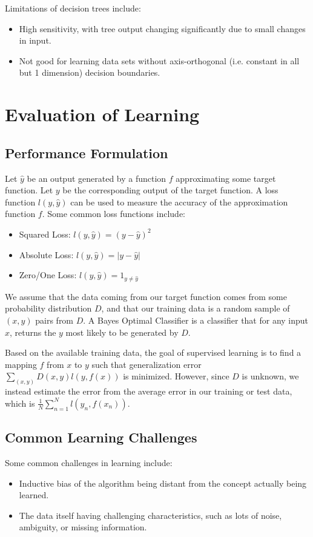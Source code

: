 \documentclass[12pt,titlepage]{article}
\let\stdsection\section
\renewcommand\section{\clearpage\stdsection}
\begin{document}
      Limitations of decision trees include:
      \begin{itemize}
        \item High sensitivity, with tree output changing significantly due to small changes in input.
        \item Not good for learning data sets without axis-orthogonal (i.e. constant in all but 1 dimension) decision boundaries.
      \end{itemize}

  \section{Evaluation of Learning}

    \subsection{Performance Formulation}
      Let $\hat{y}$ be an output generated by a function $f$ approximating some target function. Let $y$ be the corresponding
      output of the target function. A loss function $l(y, \hat{y})$ can be used to measure the accuracy of the approximation
      function $f$. Some common loss functions include:
      \begin{itemize}
        \item Squared Loss: $l(y, \hat{y}) = (y - \hat{y})^2$
        \item Absolute Loss: $l(y, \hat{y}) = |y - \hat{y}|$
        \item Zero/One Loss: $l(y, \hat{y}) = 1_{y \neq \hat{y}}$
      \end{itemize}

      We assume that the data coming from our target function comes from some probability distribution $D$, and that our training data
      is a random sample of $(x, y)$ pairs from $D$. A Bayes Optimal Classifier is a classifier that for any input $x$, returns the
      $y$ most likely to be generated by $D$.

      Based on the available training data, the goal of supervised learning is to find a mapping $f$ from $x$ to $y$ such that
      generalization error $\sum_{(x,y)} D(x,y)l(y,f(x))$ is minimized. However, since $D$ is unknown, we instead estimate the error from
      the average error in our training or test data, which is $\frac{1}{N}\sum_{n=1}^N l(y_n, f(x_n))$.

    \subsection{Common Learning Challenges}
      Some common challenges in learning include:
      \begin{itemize}
        \item Inductive bias of the algorithm being distant from the concept actually being learned.
        \item The data itself having challenging characteristics, such as lots of noise, ambiguity, or missing information.
      \end{itemize}
\end{document}
